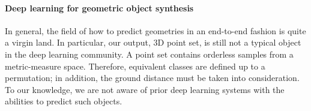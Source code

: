 \paragraph{Deep learning for geometric object synthesis} In general, the field of how to predict geometries in an end-to-end fashion is quite a virgin land. In particular, our output, 3D point set, is still not a typical object in the deep learning community. A point set contains orderless samples from a metric-measure space. Therefore, equivalent classes are defined up to a permutation; in addition, the ground distance must be taken into consideration. To our knowledge, we are not aware of prior deep learning systems with the abilities to predict such objects. %

